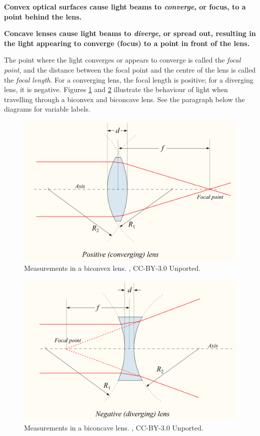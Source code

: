 \documentclass[
]{book}
\begin{document}
\textbf{Convex optical surfaces cause light beams to \emph{converge}, or focus, to a point behind the lens.}

\textbf{Concave lenses cause light beams to \emph{diverge}, or spread out, resulting in the light appearing to converge (focus) to a point in front of the lens.}

The point where the light converges or appears to converge is called the \emph{focal point}, and the distance between the focal point and the centre of the lens is called the \emph{focal length}. For a converging lens, the focal length is positive; for a diverging lens, it is negative. Figures \ref{fig:12-convex-focal-diagram} and \ref{fig:12-concave-focal-diagram} illustrate the behaviour of light when travelling through a biconvex and biconcave lens. See the paragraph below the diagrams for variable labels.



\begin{figure}
\includegraphics[width=0.75\linewidth]{images/12-convex_focal_diagram} \caption{Measurements in a biconvex lens. \citep{drbob_positive_2006}, CC-BY-3.0 Unported.}\label{fig:12-convex-focal-diagram}
\end{figure}



\begin{figure}
\includegraphics[width=0.75\linewidth]{images/12-concave_focal_diagram} \caption{Measurements in a biconcave lens. \citep{drbob_negative_2006}, CC-BY-3.0 Unported.}\label{fig:12-concave-focal-diagram}
\end{figure}
\end{document}
